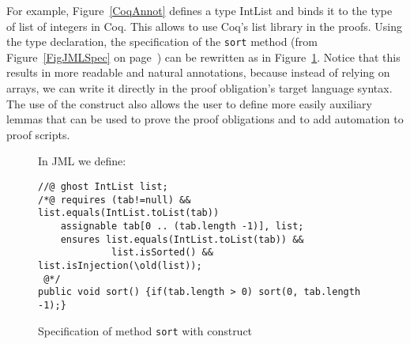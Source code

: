 For example, Figure~\ref{CoqAnnot} defines a \native type IntList and
binds it to the type of list of integers in Coq. This allows to use
Coq's list library in the proofs. Using the \native type declaration,
the specification of the {\tt sort} method (from
Figure~\ref{FigJMLSpec} on page~\pageref{FigJMLSpec}) can be rewritten
as in Figure~\ref{sortnat}. Notice that this results in more readable
and natural annotations, because instead of relying on arrays, we can
write it directly in the proof obligation's target language
syntax. The use of the \native construct also allows the user to
define more easily auxiliary lemmas that can be used to prove the
proof obligations and to add automation to proof scripts.


\begin{figure}[t!]
{\small In JML we define:
\begin{verbatim}
//@ ghost IntList list;
/*@ requires (tab!=null) && list.equals(IntList.toList(tab))
    assignable tab[0 .. (tab.length -1)], list;
    ensures list.equals(IntList.toList(tab)) &&
             list.isSorted() && list.isInjection(\old(list));
 @*/
public void sort() {if(tab.length > 0) sort(0, tab.length -1);}\end{verbatim}}
\caption{Specification of method \texttt{sort} with \native construct}
\label{sortnat} 
\end{figure}




